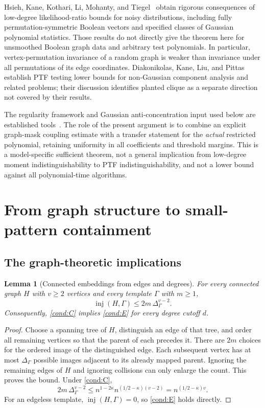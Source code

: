 \documentclass[11pt]{article}
\newcommand{\inj}{\operatorname{inj}}
\newcommand{\1}{\mathbf 1}
\newtheorem{lemma}[theorem]{Lemma}
\theoremstyle{definition}
\theoremstyle{remark}
\numberwithin{equation}{section}
\begin{document}
Hsieh, Kane, Kothari, Li, Mohanty, and Tiegel~\cite{HKKLMT} obtain rigorous consequences of low-degree likelihood-ratio bounds for noisy distributions, including fully permutation-symmetric Boolean vectors and specified classes of Gaussian polynomial statistics. Those results do not directly give the theorem here for unsmoothed Boolean graph data and arbitrary test polynomials. In particular, vertex-permutation invariance of a random graph is weaker than invariance under all permutations of its edge coordinates. Diakonikolas, Kane, Liu, and Pittas~\cite{DKLP} establish PTF testing lower bounds for non-Gaussian component analysis and related problems; their discussion identifies planted clique as a separate direction not covered by their results.

The regularity framework and Gaussian anti-concentration input used below are established tools~\cite{DSTW,CW}. The role of the present argument is to combine an explicit graph-mask coupling estimate with a transfer statement for the \emph{actual} restricted polynomial, retaining uniformity in all coefficients and threshold margins. This is a model-specific sufficient theorem, not a general implication from low-degree moment indistinguishability to PTF indistinguishability, and not a lower bound against all polynomial-time algorithms.

\section{From graph structure to small-pattern containment}

\subsection{The graph-theoretic implications}
\begin{lemma}[Connected embeddings from edges and degrees]\label{lem:edge-degree}
For every connected graph $H$ with $v\ge2$ vertices and every template $\Gamma$ with $m\ge1$,
\[
 \inj(H,\Gamma)\le2m\,\Delta_\Gamma^{v-2}.
\]
Consequently, \eqref{cond:C} implies \eqref{cond:E} for every degree cutoff $d$.
\end{lemma}
\begin{proof}
Choose a spanning tree of $H$, distinguish an edge of that tree, and order all remaining vertices so that the parent of each precedes it. There are $2m$ choices for the ordered image of the distinguished edge. Each subsequent vertex has at most $\Delta_\Gamma$ possible images adjacent to its already mapped parent. Ignoring the remaining edges of $H$ and ignoring collisions can only enlarge the count. This proves the bound. Under \eqref{cond:C},
\[
 2m\,\Delta_\Gamma^{v-2}
 \le n^{1-2\kappa}n^{(1/2-\kappa)(v-2)}
 =n^{(1/2-\kappa)v}.
\]
For an edgeless template, $\inj(H,\Gamma)=0$, so \eqref{cond:E} holds directly.
\end{proof}
\end{document}
